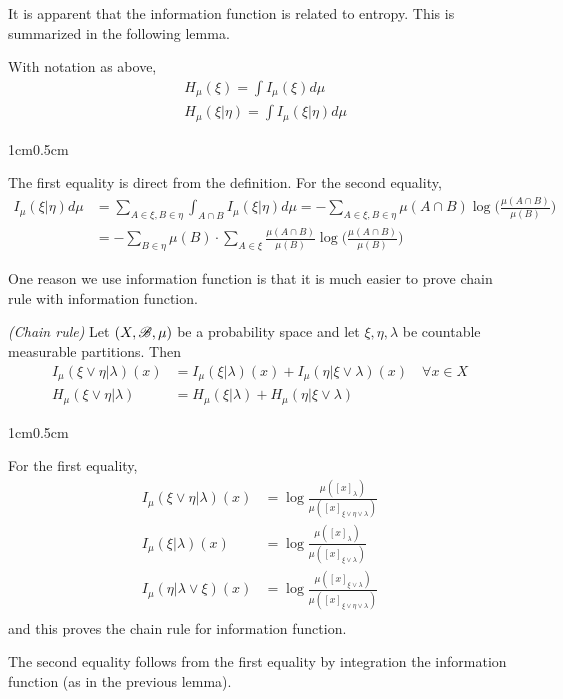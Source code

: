 \documentclass[10pt,a4paper]{report}
\newenvironment{proof}
{\begin{changemargin}{1cm}{0.5cm} 
	}%
	{\end{changemargin}
}
\begin{document}
It is apparent that the information function is related to entropy. This is summarized in the following lemma.
\s

\lem With notation as above,
\begin{align*}
& H_{\mu}(\xi) = \int I_{\mu} (\xi) d \mu \\
& H_{\mu}(\xi | \eta) = \int I_{\mu} (\xi | \eta) d \mu
\end{align*}
\begin{proof}
\pf The first equality is direct from the definition. For the second equality,
\begin{align*}
I_{\mu} (\xi |\eta) d\mu &= \sum_{A\in \xi, B \in \eta} \int_{A \cap B} I_{\mu}(\xi | \eta) d\mu = - \sum_{A \in \xi, B\in \eta} \mu(A\cap B) \log \Big( \frac{\mu(A \cap B)}{\mu(B)}\Big) \\
&= -\sum_{B\in \eta} \mu(B) \cdot \sum_{A\in \xi} \frac{\mu(A\cap B)}{\mu(B)} \log \Big( \frac{\mu(A\cap B)}{\mu(B)} \Big)
\end{align*}

\eop
\end{proof}
\s

One reason we use information function is that it is much easier to prove chain rule with information function.
\s

\lem \emph{(Chain rule)} Let $(X,\mathscr{B}, \mu)$ be a probability space and let $\xi, \eta, \lambda$ be countable measurable partitions. Then
\begin{align*}
I_{\mu} (\xi \vee \eta | \lambda)(x) &= I_{\mu}(\xi | \lambda) (x) + I_{\mu}(\eta | \xi \vee \lambda)(x) \quad \forall x \in X \\
H_{\mu} (\xi \vee \eta | \lambda) &= H_{\mu}(\xi | \lambda)  + H_{\mu}(\eta | \xi \vee \lambda)
\end{align*}
\begin{proof}
\pf For the first equality,
\begin{align*}
I_{\mu} (\xi \vee \eta |\lambda) (x)  &= \log \frac{\mu ([x]_{\lambda})}{\mu([x]_{\xi \vee \eta \vee \lambda})} \\
I_{\mu} (\xi |\lambda) (x)  &= \log \frac{\mu ([x]_{\lambda})}{\mu([x]_{\xi \vee \lambda})} \\
I_{\mu} (\eta |\lambda \vee \xi) (x)  &= \log \frac{\mu ([x]_{\xi \vee \lambda})}{\mu([x]_{\xi \vee \eta \vee \lambda})} \\
\end{align*}
and this proves the chain rule for information function.

\quad The second equality follows from the first equality by integration the information function (as in the previous lemma).

\eop
\end{proof}
\s
\end{document}
